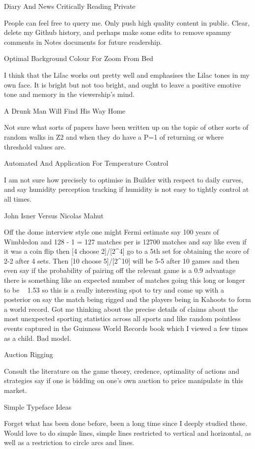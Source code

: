 	Diary And News Critically Reading Private

People can feel free to query me. Only push high quality content in public. Clear, delete my Github history, and perhaps make some edits to remove spammy comments in Notes documents for future readership.

	Optimal Background Colour For Zoom From Bed

I think that the Lilac works out pretty well and emphasises the Lilac tones in my own face. It is bright but not too bright, and ought to leave a positive emotive tone and memory in the viewership's mind.

	A Drunk Man Will Find His Way Home

Not sure what sorts of papers have been written up on the topic of other sorts of random walks in Z2 and when they do have a P=1 of returning or where threshold values are.

	Automated And Application For Temperature Control

I am not sure how precisely to optimise in Builder with respect to daily curves, and say humidity perception tracking if humidity is not easy to tightly control at all times.

	John Isner Versus Nicolas Mahut

Off the dome interview style one might Fermi estimate say 100 years of Wimbledon and 128 - 1 = 127 matches per is 12700 matches and say like even if it was a coin flip then [4 choose 2]/[2^4] go to a 5th set for obtaining the score of 2-2 after 4 sets. Then [10 choose 5]/[2^10] will be 5-5 after 10 games and then even say if the probability of pairing off the relevant game is a 0.9 advantage there is something like an expected number of matches going this long or longer to be ~ 1.53 so this is a really interesting spot to try and come up with a posterior on say the match being rigged and the players being in Kahoots to form a world record. Got me thinking about the precise details of claims about the most unexpected sporting statistics across all sports and like random pointless events captured in the Guinness World Records book which I viewed a few times as a child. Bad model.

	Auction Rigging

Consult the literature on the game theory, credence, optimality of actions and strategies say if one is bidding on one's own auction to price manipulate in this market.

	Simple Typeface Ideas

Forget what has been done before, been a long time since I deeply studied these. Would love to do simple lines, simple lines restricted to vertical and horizontal, as well as a restriction to circle arcs and lines.

